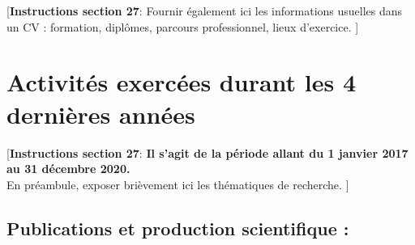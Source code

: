 \documentclass[a4paper,10pt]{article}
\newcommand{\instructionsSection}[1]{{\color{blue}[\textbf{Instructions section 27}: #1]}}
\newcommand{\instructionsSection}[1]{}
\begin{document}
\instructionsSection{%
	Fournir également ici les informations usuelles dans un CV : formation, diplômes, parcours professionnel, lieux d'exercice.
}


\section{Activités exercées durant les 4 dernières années}

\instructionsSection{%
\textbf{Il s'agit de la période allant du 1\ier{} janvier 2017 au 31 décembre 2020.}
\\
En préambule, exposer brièvement ici les thématiques de recherche. 
}


\subsection{Publications et production scientifique :}
\end{document}
